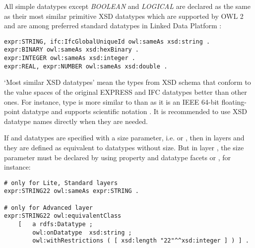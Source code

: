 \begin{ontologyRule}
All simple data\-types except \emph{BOOLEAN} and \emph{LOGICAL} are declared as the same as their most similar primitive XSD data\-types which are supported by OWL 2 \cite{w3c:owl2-profiles} and are among preferred standard data\-types in Linked Data Platform \cite{w3c:ldp-best-practices}:

\begin{lstlisting}
expr:STRING, ifc:IfcGlobalUniqueId owl:sameAs xsd:string .
expr:BINARY owl:sameAs xsd:hexBinary .
expr:INTEGER owl:sameAs xsd:integer .
expr:REAL, expr:NUMBER owl:sameAs xsd:double .
\end{lstlisting}
\end{ontologyRule}

`Most similar XSD data\-types' mean the types from XSD schema that conform to the value spaces of the original EXPRESS and IFC data\-types better than other ones. For instance, type  is more similar to  than  as it is an IEEE 64-bit floating-point data\-type and supports scientific notation \cite{w3c:xsd,datapic:xsd}. It is recommended to use XSD data\-type names directly when they are needed.

\begin{ontologyRule}If  and  data\-types are specified with a size parameter, i.e.  or , then in layers \lite{} and \standard{} they are defined as equivalent to data\-types without size. But in layer \advanced{}, the size parameter must be declared by using property  and data\-type facets  or  \cite{w3c:owl2-syntax,w3c:xmlschema11-2}, for instance:

\begin{lstlisting}
# only for Lite, Standard layers
expr:STRING22 owl:sameAs expr:STRING .

# only for Advanced layer
expr:STRING22 owl:equivalentClass
    [   a rdfs:Datatype ;
        owl:onDatatype  xsd:string ;
        owl:withRestrictions ( [ xsd:length "22"^^xsd:integer ] ) ] .
\end{lstlisting}
\end{ontologyRule}

